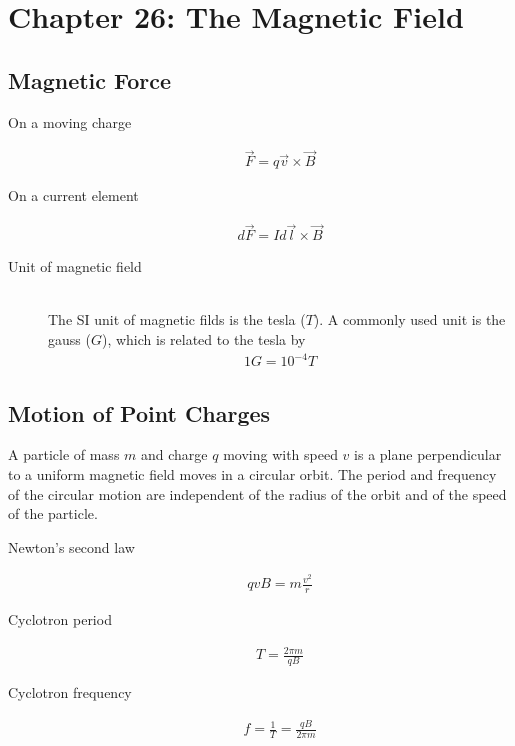 \documentclass[../main.tex]{subfiles}
\begin{document}
\section{Chapter 26: The Magnetic Field}
\label{sec:chapter_26_the_magnetic_field}

\subsection{Magnetic Force}
\label{sub:magnetic_force}

\begin{description}
  \item[On a moving charge]
    \begin{align}
      \vec{F} = q\vec{v}\times\vec{B}
    \end{align}
  \item[On a current element]
    \begin{align}
      d\vec{F} = Id\vec{l}\times\vec{B}
    \end{align}
  \item[Unit of magnetic field] \hfill \\
    The SI unit of magnetic filds is the tesla ($T$). A commonly used unit is
    the gauss ($G$), which is related to the tesla by
    \begin{align}
      1G = 10^{-4}T
    \end{align}
\end{description}

\subsection{Motion of Point Charges}
\label{sub:motion_of_point_charges}

A particle of mass $m$ and charge $q$ moving with speed $v$ is a plane
perpendicular to a uniform magnetic field moves in a circular orbit. The period
and frequency of the circular motion are independent of the radius of the orbit
and of the speed of the particle.

\begin{description}
  \item[Newton's second law]
    \begin{align}
      qvB = m\frac{v^2}{r}
    \end{align}
  \item[Cyclotron period]
    \begin{align}
      T = \frac{2\pi m}{qB}
    \end{align}
  \item[Cyclotron frequency]
    \begin{align}
      f = \frac{1}{T} = \frac{qB}{2\pi m}
    \end{align}
\end{description}
\end{document}
